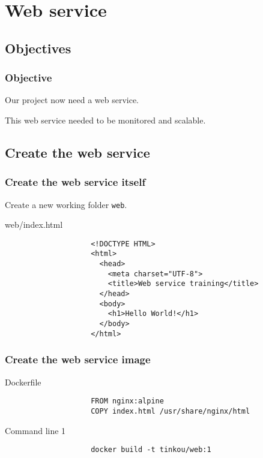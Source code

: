 \section{Web service}

\subsection{Objectives}

	\begin{frame}
		\frametitle{Objective}
		
		Our project now need a web service.

		\bigskip
		This web service needed to be monitored and scalable.		
		
	\end{frame}
	
\subsection{Create the web service}
	\begin{frame}[fragile]
		\frametitle{Create the web service itself}
		
		Create a new working folder \verb!web!.

		\begin{block}{web/index.html}
			\begin{small}
				\begin{verbatim}
					<!DOCTYPE HTML>
					<html>
					  <head>
					    <meta charset="UTF-8">
					    <title>Web service training</title>
					  </head>
					  <body>
					    <h1>Hello World!</h1>
					  </body>
					</html>
				\end{verbatim}
			\end{small}
		\end{block}			
	\end{frame}
	
	\begin{frame}[fragile]
		\frametitle{Create the web service image}
		
		\begin{block}{Dockerfile}
			\begin{small}
				\begin{verbatim}
					FROM nginx:alpine
					COPY index.html /usr/share/nginx/html
				\end{verbatim}
			\end{small}
		\end{block}
		
		\begin{block}{Command line 1}
			\begin{small}
				\begin{verbatim}
					docker build -t tinkou/web:1
				\end{verbatim}
			\end{small}
		\end{block}
		
	\end{frame}
	
